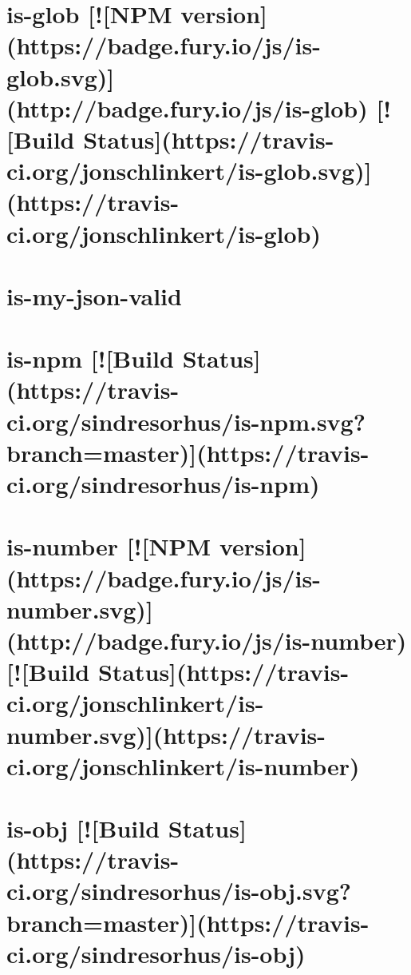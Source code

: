 \documentclass[twoside]{book}
\newcommand{\+}{\discretionary{\mbox{\scriptsize$\hookleftarrow$}}{}{}}
\begin{document}
\chapter{is-\/glob \mbox{[}!\mbox{[}N\+PM version\mbox{]}(https\+://badge.fury.\+io/js/is-\/glob.svg)\mbox{]}(http\+://badge.fury.\+io/js/is-\/glob) \mbox{[}!\mbox{[}Build Status\mbox{]}(https\+://travis-\/ci.org/jonschlinkert/is-\/glob.svg)\mbox{]}(https\+://travis-\/ci.org/jonschlinkert/is-\/glob)}
\label{md__c_1_workspace_demo_src_main_script_node_modules_is-glob__r_e_a_d_m_e}

\chapter{is-\/my-\/json-\/valid}
\label{md__c_1_workspace_demo_src_main_script_node_modules_is-my-json-valid__r_e_a_d_m_e}

\chapter{is-\/npm \mbox{[}!\mbox{[}Build Status\mbox{]}(https\+://travis-\/ci.org/sindresorhus/is-\/npm.svg?branch=master)\mbox{]}(https\+://travis-\/ci.org/sindresorhus/is-\/npm)}
\label{md__c_1_workspace_demo_src_main_script_node_modules_is-npm_readme}

\chapter{is-\/number \mbox{[}!\mbox{[}N\+PM version\mbox{]}(https\+://badge.fury.\+io/js/is-\/number.svg)\mbox{]}(http\+://badge.fury.\+io/js/is-\/number) \mbox{[}!\mbox{[}Build Status\mbox{]}(https\+://travis-\/ci.org/jonschlinkert/is-\/number.svg)\mbox{]}(https\+://travis-\/ci.org/jonschlinkert/is-\/number)}
\label{md__c_1_workspace_demo_src_main_script_node_modules_is-number__r_e_a_d_m_e}

\chapter{is-\/obj \mbox{[}!\mbox{[}Build Status\mbox{]}(https\+://travis-\/ci.org/sindresorhus/is-\/obj.svg?branch=master)\mbox{]}(https\+://travis-\/ci.org/sindresorhus/is-\/obj)}
\label{md__c_1_workspace_demo_src_main_script_node_modules_is-obj_readme}

\end{document}
